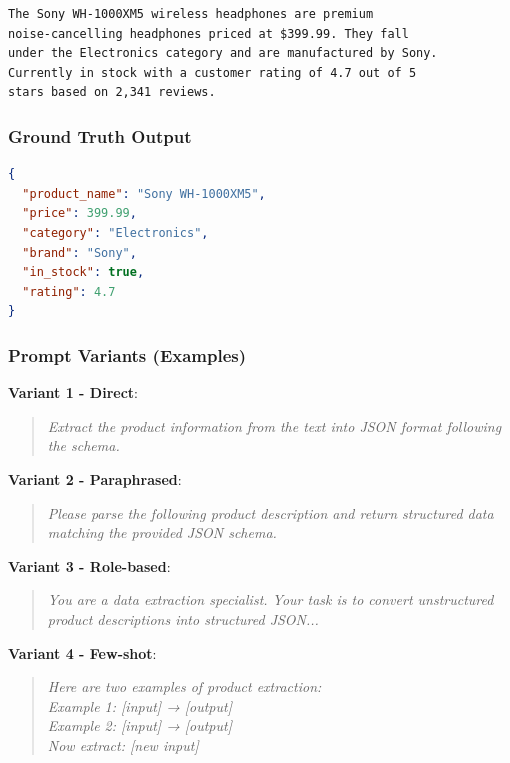 \documentclass[11pt,a4paper]{article}
\begin{document}
\begin{lstlisting}[caption=Example product description]
The Sony WH-1000XM5 wireless headphones are premium 
noise-cancelling headphones priced at $399.99. They fall 
under the Electronics category and are manufactured by Sony. 
Currently in stock with a customer rating of 4.7 out of 5 
stars based on 2,341 reviews.
\end{lstlisting}

\subsubsection{Ground Truth Output}

\begin{lstlisting}[language=json, caption=Expected JSON extraction]
{
  "product_name": "Sony WH-1000XM5",
  "price": 399.99,
  "category": "Electronics",
  "brand": "Sony",
  "in_stock": true,
  "rating": 4.7
}
\end{lstlisting}

\subsubsection{Prompt Variants (Examples)}

\textbf{Variant 1 - Direct}:
\begin{quote}
\textit{Extract the product information from the text into JSON format following the schema.}
\end{quote}

\textbf{Variant 2 - Paraphrased}:
\begin{quote}
\textit{Please parse the following product description and return structured data matching the provided JSON schema.}
\end{quote}

\textbf{Variant 3 - Role-based}:
\begin{quote}
\textit{You are a data extraction specialist. Your task is to convert unstructured product descriptions into structured JSON...}
\end{quote}

\textbf{Variant 4 - Few-shot}:
\begin{quote}
\textit{Here are two examples of product extraction:\\ 
Example 1: [input] → [output]\\
Example 2: [input] → [output]\\
Now extract: [new input]}
\end{quote}
\end{document}
